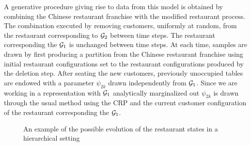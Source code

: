 A generative procedure giving rise to data from this model is obtained by combining the Chinese restaurant franchise with the modified restaurant process.  The combination executed by removing customers, uniformly at random, from the restaurant corresponding to $\G_2$ between time steps.  The restaurant corresponding the $\G_1$ is unchanged between time steps. At each time, samples are drawn by first producing a partition from the Chinese restaurant franchise using initial restaurant configurations set to the restaurant configurations produced by the deletion step.  After seating the new customers,  previously unoccupied tables are endowed with a parameter $\psi_{2k}$ drawn independently from $\G_1$.  Since we are working in a representation with $\G_1$ analytically marginalized out $\psi_{2k}$ is drawn through the usual method using the CRP and the current customer configuration of the restaurant corresponding the $\G_1$.


\begin{figure}[h!tbp] 
	\begin{center}
		\caption{An example of the possible evolution of the restaurant states in a hierarchical setting}
		\label{figVHPY}
	\end{center} 
\end{figure} 

